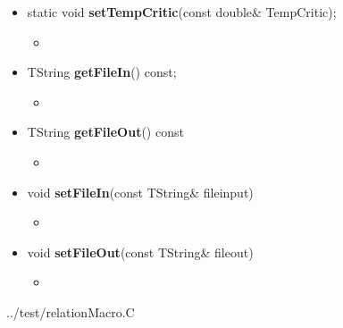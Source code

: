 \begin{itemize}
\begin{itemize}
  \item[] static void \textbf{setTempCritic}(const double\& \textunderscore TempCritic);
    \begin{itemize}
    \item[]
    \end{itemize}

  \item[] TString \textbf{getFileIn}() const;
    \begin{itemize}
    \item[]
    \end{itemize}

  \item[] TString \textbf{getFileOut}() const
    \begin{itemize}
    \item[]
    \end{itemize}

  \item[]  void \textbf{setFileIn}(const TString\& file\textunderscore input)
    \begin{itemize}
    \item[]
    \end{itemize}

  \item[] void \textbf{setFileOut}(const TString\& file\textunderscore out)
    \begin{itemize}
    \item[]
    \end{itemize}

  \end{itemize}


\end{itemize}


{../test/relationMacro.C}
